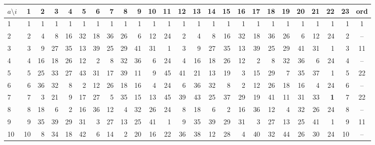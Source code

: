 \begin{refsegment}
\begin{table}[ht]
\label{SrcArith3c}
{\textmd \small
\begin{center}
\vspace{-2ex}  %
\begin{tabular}{|p{16 pt}||@{\:}r@{\:}|@{\:}r@{\:}|@{\:}r@{\:}|@{\:}r@{\:}|@{\:}r@{\:}|@{\:}r@{\:}|@{\:}r@{\:}|@{\:}r@{\:}|@{\:}r@{\:}|@{\:}r@{\:}|@{\:}r@{\:}|@{\:}r@{\:}|@{\:}r@{\:}|@{\:}r@{\:}|@{\:}r@{\:}|@{\:}r@{\:}|@{\:}r@{\:}|@{\:}r@{\:}|@{\:}r@{\:}|@{\:}r@{\:}|@{\:}r@{\:}|@{\:}r@{\:}|@{\:}r@{\:}|c|}
\hline
$a \setminus i$   & 1 & 2 & 3 & 4 & 5 & 6 & 7 & 8 & 9 & 10 & 11 & 12 & 13 & 14 & 15 & 16 & 17 & 18 & 19 & 20 & 21 & 22 & 23 & ord\\
\hline
\hline
1    & 1  & 1  & 1  & 1  & 1  & 1  & 1  & 1  & 1  & 1  & 1  & 1  & 1  & 1  & 1  & 1  & 1  & 1  & 1  & 1  & 1  & 1  & 1 & 1\\
\hline
2 & 2  & 4  & 8 & 16 & 32 & 18 & 36 & 26  & 6 & 12 & 24  & 2  & 4  & 8 & 16 & 32 & 18 & 36 & 26  & 6 & 12 & 24  & 2 & --\\
\hline
3 & 3  & 9 & 27 & 35 & 13 & 39 & 25 & 29 & 41 & 31  & 1  & 3  & 9 & 27 & 35 & 13 & 39 & 25 & 29 & 41 & 31  & 1  & 3 & 11\\
\hline
4  & 4 & 16 & 18 & 26 & 12  & 2  & 8 & 32 & 36  & 6 & 24  & 4 & 16 & 18 & 26 & 12  & 2  & 8 & 32 & 36  & 6 & 24  & 4 & --\\
\hline
5 & 5 & 25 & 33 & 27 & 43 & 31 & 17 & 39 & 11  & 9 & 45 & 41 & 21 & 13 & 19  & 3 & 15 & 29  & 7 & 35 & 37  & 1  & 5 & 22\\
\hline
6 & 6 & 36 & 32  & 8  & 2 & 12 & 26 & 18 & 16  & 4 & 24  & 6 & 36 & 32  & 8  & 2 & 12 & 26 & 18 & 16  & 4 & 24  & 6 & --\\
\hline
7 & 7  & 3 & 21  & 9 & 17 & 27  & 5 & 35 & 15 & 13 & 45 & 39 & 43 & 25 & 37 & 29 & 19 & 41 & 11 & 31 & 33  & \textbf{1}  & 7 & 22\\
\hline
8 & 8 & 18  & 6  & 2 & 16 & 36 & 12  & 4 & 32 & 26 & 24  & 8 & 18  & 6  & 2 & 16 & 36 & 12  & 4 & 32 & 26 & 24  & 8 & --\\
\hline
9 & 9 & 35 & 39 & 29 & 31  & 3 & 27 & 13 & 25 & 41  & 1  & 9 & 35 & 39 & 29 & 31  & 3 & 27 & 13 & 25 & 41  & 1  & 9 & 11\\
\hline
10 & 10  & 8 & 34 & 18 & 42  & 6 & 14  & 2 & 20 & 16 & 22 & 36 & 38 & 12 & 28  & 4 & 40 & 32 & 44 & 26 & 30 & 24 & 10 & --\\

\end{tabular}
\end{center}}
\end{table}
\end{refsegment}
